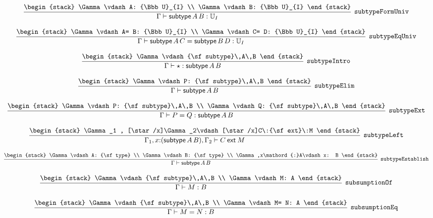 \[
\infer[{\tt subtypeFormUniv}]{\Gamma \vdash {\sf subtype}\,A\,B: {\Bbb U}_{I}}{
\begin{stack}
\Gamma \vdash A: {\Bbb U}_{I}
\\
\Gamma \vdash B: {\Bbb U}_{I}
\end{stack}}
\]

\[
\infer[{\tt subtypeEqUniv}]{\Gamma \vdash {\sf subtype}\,A\,C= {\sf subtype}\,B\,D: {\Bbb U}_{I}}{
\begin{stack}
\Gamma \vdash A= B: {\Bbb U}_{I}
\\
\Gamma \vdash C= D: {\Bbb U}_{I}
\end{stack}}
\]

\[
\infer[{\tt subtypeIntro}]{\Gamma \vdash \star : {\sf subtype}\,A\,B}{
\begin{stack}
\Gamma \vdash {\sf subtype}\,A\,B
\end{stack}}
\]

\[
\infer[{\tt subtypeElim}]{\Gamma \vdash {\sf subtype}\,A\,B}{
\begin{stack}
\Gamma \vdash P: {\sf subtype}\,A\,B
\end{stack}}
\]

\[
\infer[{\tt subtypeExt}]{\Gamma \vdash P= Q: {\sf subtype}\,A\,B}{
\begin{stack}
\Gamma \vdash P: {\sf subtype}\,A\,B
\\
\Gamma \vdash Q: {\sf subtype}\,A\,B
\end{stack}}
\]

\[
\infer[{\tt subtypeLeft}]{\Gamma_1 ,x\mathord{:}({\sf subtype}\,A\,B), \Gamma_2 \vdash C\:{\sf ext}\:M}{
\begin{stack}
\Gamma_1 , [\star /x]\Gamma_2\vdash [\star /x]C\:{\sf ext}\:M
\end{stack}}
\]

\[
\infer[{\tt subtypeEstablish}]{\Gamma \vdash {\sf subtype}\,A\,B}{
\begin{stack}
\Gamma \vdash A: {\sf type}
\\
\Gamma \vdash B: {\sf type}
\\
\Gamma ,x\mathord{:}A\vdash x: B
\end{stack}}
\]

\[
\infer[{\tt subsumptionOf}]{\Gamma \vdash M: B}{
\begin{stack}
\Gamma \vdash {\sf subtype}\,A\,B
\\
\Gamma \vdash M: A
\end{stack}}
\]

\[
\infer[{\tt subsumptionEq}]{\Gamma \vdash M= N: B}{
\begin{stack}
\Gamma \vdash {\sf subtype}\,A\,B
\\
\Gamma \vdash M= N: A
\end{stack}}
\]

